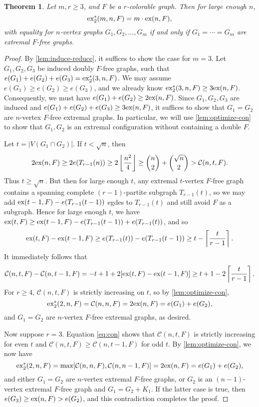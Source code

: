 \documentclass[10pt, reqno]{report}
\newtheorem{theorem}{Theorem}[chapter]
\newcommand*{\ex}{\textnormal{ex}}
\newcommand*{\dex}{\textnormal{ex}_2}
\newcommand*{\con}{\mathcal{C}}
\begin{document}
\begin{theorem}
  Let $m, r \geq 3$, and $F$ be a $r$-colorable graph. Then for large enough $n$, 
  \[
    \dex^*(m, n, F) = m \cdot \ex(n, F),
  \]
  with equality for $n$-vertex graphs $G_1, G_2, \ldots, G_m$ if and only if $G_1 = \cdots = G_m$ are extremal $F$-free graphs.
\end{theorem}

\begin{proof}
  By \cref{lem:induce-reduce}, it suffices to show the case for $m = 3$. Let $G_1, G_2, G_3$ be induced doubly $F$-free graphs, such that $e(G_1) + e(G_2) + e(G_3) = \dex^*(3, n, F)$. We may assume $e(G_1) \geq e(G_2) \geq e(G_3)$, and we already know $\dex^*(3, n, F) \geq 3\ex(n, F)$. Consequently, we must have $e(G_1) + e(G_2) \geq 2\ex(n, F)$. Since $G_1, G_2, G_3$ are induced and $e(G_1) + e(G_2) + e(G_3) \geq 3\ex(n, F)$, it suffices to show that $G_1 = G_2$ are $n$-vertex $F$-free extremal graphs. In particular, we will use \cref{lem:optimize-con} to show that $G_1, G_2$ is an extremal configuration without containing a double $F$.
  
  Let $t = |V(G_1 \cap G_2)|$. If $t < \sqrt{n}$, then
  \[
    2\ex(n, F) \geq 2e(T_{r - 1}(n)) \geq 2\left\lfloor\frac{n^2}{4}\right\rfloor \geq \binom{n}{2} + \binom{\sqrt{n}}{2} > \con(n, t, F).
  \]
  Thus $t \geq \sqrt{n}$. But then for large enough $t$, any extremal $t$-vertex $F$-free graph contains a spanning complete $(r - 1)$-partite subgraph $T_{r - 1}(t)$, so we may add $\ex(t - 1, F) - e(T_{r - 1}(t - 1))$ egdes to $T_{r - 1}(t)$ and still avoid $F$ as a subgraph. Hence for large enough $t$, we have $\ex(t, F) \geq \ex(t - 1, F) - e(T_{r - 1}(t - 1)) + e(T_{r - 1}(t))$, and so
  \[
    \ex(t, F) - \ex(t - 1, F) \geq e(T_{r - 1}(t)) - e(T_{r - 1}(t - 1)) \geq t - \left\lceil \frac{t}{r - 1} \right\rceil.
  \]
  It immediately follows that
  \begin{equation}
    \con(n, t, F) - \con(n, t - 1, F) = - t + 1 + 2[\ex(t, F) - \ex(t - 1, F)] \geq t + 1 - 2\left\lceil \frac{t}{r - 1} \right\rceil. \label{eq:con}
  \end{equation}
  For $r \geq 4$, $\con(n, t, F)$ is strictly increasing on $t$, so by \cref{lem:optimize-con}, 
  \[
    \dex^*(2, n, F) = \con(n, n, F) = 2\ex(n, F) = e(G_1) + e(G_2),
  \] 
  and $G_1 = G_2$ are $n$-vertex $F$-free extremal graphs, as desired. 
  
  Now suppose $r = 3$. Equation \eqref{eq:con} shows that $\con(n, t, F)$ is strictly increasing for even $t$ and $\con(n, t, F) \geq \con(n, t - 1, F)$ for odd $t$. By \cref{lem:optimize-con}, we now have 
  \[
    \dex^*(2, n, F) = \max[\con(n, n, F), \con(n, n - 1, F)] = 2\ex(n, F) = e(G_1) + e(G_2),
  \]
  and either $G_1 = G_2$ are $n$-vertex extremal $F$-free graphs, or $G_2$ is an $(n - 1)$-vertex extremal $F$-free graph and $G_1 = G_2 + K_1$. If the latter case is true, then $e(G_3) \geq \ex(n, F) > e(G_2)$, and this contradiction completes the proof.
\end{proof}
\end{document}
